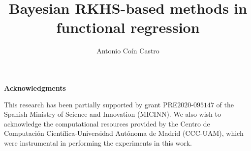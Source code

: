 \documentclass{mimosis}
\title{\textbf{Bayesian RKHS-based methods in functional regression}}
\author{Antonio Coín Castro}
\newcommand{\thesisPath}{chapters}
\newcommand{\titlecolor}{teal}
\renewcommand*{\chapterformat}{%
  \fontsize{60}{65}\selectfont\color{\titlecolor}\(\thechapter\)\autodot\enskip
}
\theoremstyle{theorem}
\theoremstyle{definition}
\theoremstyle{remark}
\begin{document}
\frontmatter
  
  

  \vspace*{-1.8cm}
  \tableofcontents

\mainmatter









\appendix

\renewcommand*{\chapterformat}{%
  \fontsize{60}{65}\selectfont\color{\titlecolor}\thechapter\autodot\enskip
}





\backmatter

\printbibliography

\begin{center}
\vspace{.25em}
\color{teal}\FourStar
\end{center}

\noindent \textbf{Acknowledgments}
\vspace{.5em}

\begin{small}
\noindent This research has been partially supported by grant PRE\(2020\)-\(095147\) of the Spanish Ministry of Science and Innovation (MICINN). We also wish to acknowledge the computational resources provided by the Centro de Computación Científica-Universidad Autónoma de Madrid (CCC-UAM), which were instrumental in performing the experiments in this work.
\end{small}
\end{document}

